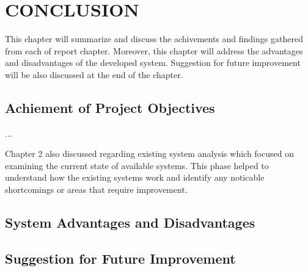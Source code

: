\documentclass[../index.tex]{subfiles}
\begin{document}
\chapter{CONCLUSION}

This chapter will summarize and discuss the achivements and findings gathered from each of report
chapter. Moreover, this chapter will address the advantages and disadvantages of the developed
system. Suggestion for future improvement will be also discussed at the end of the chapter.

\section{Achiement of Project Objectives}

...

Chapter 2 also discussed regarding existing system analysis which focused on examining the current
state of available systems. This phase helped to understand how the existing systems work and
identify any noticable shortcomings or areas that require improvement.

\section{System Advantages and Disadvantages}

\section{Suggestion for Future Improvement}
\end{document}

